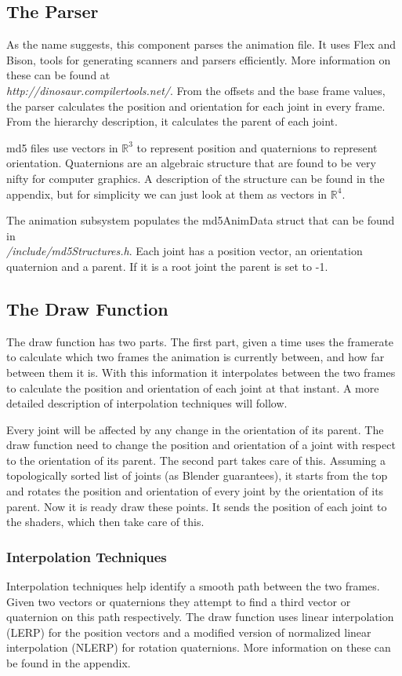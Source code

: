 \documentclass[10pt]{article}
\begin{document}
\subsection{The Parser}
As the name suggests, this component parses the animation file. It uses Flex and
Bison, tools for generating scanners and parsers efficiently. More information
on these can be found at \\\textit{http://dinosaur.compilertools.net/}. From the offsets
and the base frame values, the parser calculates the position and orientation for each
joint in every frame. From the hierarchy description, it calculates the parent of each joint.

md5 files use vectors in $\mathbb{R}^3$ to represent position and quaternions to
represent orientation. Quaternions are an algebraic structure that are found to
be very nifty for computer graphics. A description of the structure can be found
in the appendix, but for simplicity we can just look at them as vectors in
$\mathbb{R}^4$.

The animation subsystem populates the md5AnimData struct that can be
found in \\ \textit{/include/md5Structures.h}. Each joint has a position vector, an
orientation quaternion and a parent. If it is a root joint the parent is set to
-1.

\subsection{The Draw Function}
The draw function has two parts. The first part, given a time uses the framerate
to calculate which two frames the animation is currently between, and how far
between them it is. With this information it interpolates between the two frames to
calculate the position and orientation of each joint at that instant. A more
detailed description of interpolation techniques will follow. 

Every joint will be affected by any change in the orientation of its parent. 
The draw function need to change the position and orientation of a joint with 
respect to the orientation of its parent. The second part takes care of this. 
Assuming a topologically sorted list of joints (as Blender guarantees), it starts
from the top and rotates the position and orientation of every joint by the
orientation of its parent. Now it is ready draw these points. It sends the
position of each joint to the shaders, which then take care of this.

\subsubsection{Interpolation Techniques}
Interpolation techniques help identify a smooth path between the two frames. 
Given two vectors or quaternions they attempt to find a third vector or quaternion on this
path respectively. The draw function uses linear interpolation (LERP) for the
position vectors and a modified version of normalized linear interpolation
(NLERP) for rotation quaternions. More information on these can be found in the
appendix.
\end{document}
